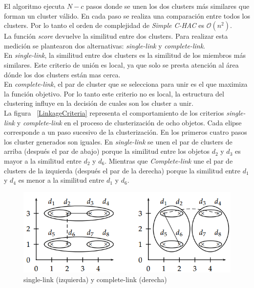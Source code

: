 El algoritmo ejecuta $N - c$ pasos donde se unen los dos clusters más similares que forman un cluster válido. En cada paso se realiza una comparación entre todos los clusters. Por lo tanto el orden de complejidad de \textit{Simple C-HAC} es $\mathcal{O}(n^{2})$.\\

La función \textit{score} devuelve la similitud entre dos clusters. Para realizar esta medición se plantearon dos alternativas: \textit{single-link} y \textit{complete-link}.\\

En \textit{single-link}, la similitud entre dos clusters es la similitud de los miembros más similares. Este criterio de unión es local, ya que solo se presta atención al área dónde los dos clusters están mas cerca.\\

En \textit{complete-link}, el par de cluster que se selecciona para unir es el que maximiza la función objetivo. Por lo tanto este criterio no es local, la estructura del clustering influye en la decisión de cuales son los cluster a unir.\\

La figura ~\ref{LinkageCriteria} representa el comportamiento de los criterios \textit{single-link} y \textit{complete-link} en el proceso de clusterización de ocho objetos. Cada elipse corresponde a un paso sucesivo de la clusterización. En los primeros cuatro pasos los cluster generados son iguales. En \textit{single-link} se unen el par de clusters de arriba (después el par de abajo) porque la similitud entre los objetos $d_2$ y $d_3$ es mayor a la similitud entre $d_2$ y $d_6$. Mientras que \textit{Complete-link} une el par de clusters de la izquierda (después el par de la derecha) porque la similitud entre 
 $d_1$ y $d_4$ es menor a la similitud entre $d_1$ y $d_6$.\\

\begin{figure}[H]
  \centering
    \includegraphics[width=1\textwidth]{img/LinkageCriteria.png}
  \caption{single-link (izquierda) y complete-link (derecha)}
  \label{des:LinkageCriteria}
\end{figure}


